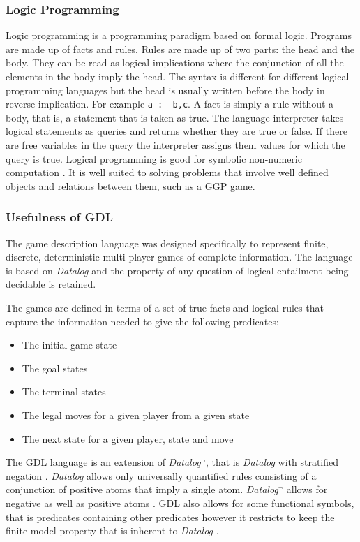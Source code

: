 \subsubsection{Logic Programming}
Logic programming is a programming paradigm based on formal logic. Programs are made up of facts and rules. Rules are made up of two parts: the head and the body. They can be read as logical implications where the conjunction of all the elements in the body imply the head. The syntax is different for different logical programming languages but the head is usually written before the body in reverse implication. For example \texttt{a :- b,c}. A fact is simply a rule without a body, that is, a statement that is taken as true. The language interpreter takes logical statements as queries and returns whether they are true or false. If there are free variables in the query the interpreter assigns them values for which the query is true. Logical programming is good for symbolic non-numeric computation \cite{Bratko}. It is well suited to solving problems that involve well defined objects and relations between them, such as a GGP game.
\subsubsection{Usefulness of GDL}
The game description language was designed specifically to represent finite, discrete, deterministic multi-player games of complete information. The language is based on \textit{Datalog} and the property of any question of logical entailment being decidable is retained.

The games are defined in terms of a set of true facts and logical rules that capture the information needed to give the following predicates:
\begin{itemize}
\item The initial game state
\item The goal states
\item The terminal states
\item The legal moves for a given player from a given state
\item The next state for a given player, state and move
\end{itemize}

The GDL language is an extension of \textit{Datalog$^{\neg}$}, that is \textit{Datalog} with stratified negation \cite{GDL_Spec}. \textit{Datalog} allows only universally quantified rules consisting of a conjunction of positive atoms that imply a single atom. \textit{Datalog$^{\neg}$} allows for negative as well as positive atoms \cite{Alice/Foundations}. GDL also allows for some functional symbols, that is predicates containing other predicates however it restricts to keep the finite model property that is inherent to \textit{Datalog} \cite{GDL_Spec}.

